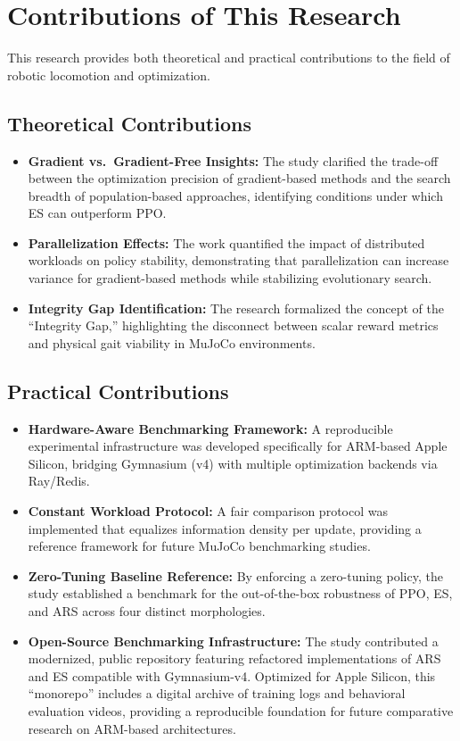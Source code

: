 \section{Contributions of This Research}

This research provides both theoretical and practical contributions to the field of robotic locomotion and optimization.

\subsection{Theoretical Contributions}

\begin{itemize}
    \item \textbf{Gradient vs.\ Gradient-Free Insights:} The study clarified the trade-off between the optimization precision of gradient-based methods and the search breadth of population-based approaches, identifying conditions under which ES can outperform PPO.
    \item \textbf{Parallelization Effects:} The work quantified the impact of distributed workloads on policy stability, demonstrating that parallelization can increase variance for gradient-based methods while stabilizing evolutionary search.
    \item \textbf{Integrity Gap Identification:} The research formalized the concept of the ``Integrity Gap,'' highlighting the disconnect between scalar reward metrics and physical gait viability in MuJoCo environments.
\end{itemize}

\subsection{Practical Contributions}

\begin{itemize}
    \item \textbf{Hardware-Aware Benchmarking Framework:} A reproducible experimental infrastructure was developed specifically for ARM-based Apple Silicon, bridging Gymnasium (v4) with multiple optimization backends via Ray/Redis.
    \item \textbf{Constant Workload Protocol:} A fair comparison protocol was implemented that equalizes information density per update, providing a reference framework for future MuJoCo benchmarking studies.
    \item \textbf{Zero-Tuning Baseline Reference:} By enforcing a zero-tuning policy, the study established a benchmark for the out-of-the-box robustness of PPO, ES, and ARS across four distinct morphologies.
    \item \textbf{Open-Source Benchmarking Infrastructure:} 
The study contributed a modernized, public repository featuring refactored implementations of ARS and ES compatible with Gymnasium-v4. Optimized for Apple Silicon, this ``monorepo'' includes a digital archive of training logs and behavioral evaluation videos, providing a reproducible foundation for future comparative research on ARM-based architectures.
\end{itemize}

